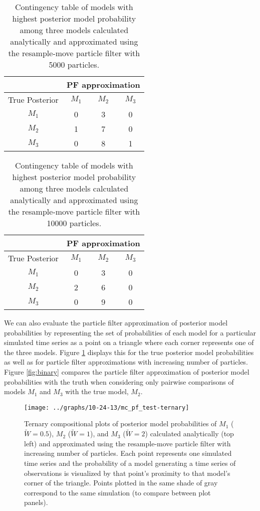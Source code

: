 \documentclass{article}
\begin{document}
\begin{table}[h]
\centering
\caption{Contingency table of models with highest posterior model probability among three models calculated analytically and approximated using the resample-move particle filter with 5000 particles.}
\label{tab:cont-5000}
\begin{tabular}{|c|c|c|c|}
  \hline
 & \multicolumn{3}{|c|}{PF approximation} \\
 \hline
 True Posterior & $M_1$& $M_2$ & $M_3$ \\
  \hline
$M_1$ &   0 &   3 &   0 \\
\hline
  $M_2$ &   1 &   7 &   0 \\
  \hline
  $M_3$ &   0 &   8 &   1 \\
   \hline
\end{tabular}
\end{table}

\begin{table}[h]
\centering
\caption{Contingency table of models with highest posterior model probability among three models calculated analytically and approximated using the resample-move particle filter with 10000 particles.}
\label{tab:cont-10000}
\begin{tabular}{|c|c|c|c|}
  \hline
 & \multicolumn{3}{|c|}{PF approximation} \\
 \hline
 True Posterior & $M_1$& $M_2$ & $M_3$ \\
  \hline
$M_1$ &   0 &   3 &   0 \\
  \hline
  $M_2$ &   2 &   6 &   0 \\
  \hline
  $M_3$ &   0 &   9 &   0 \\
   \hline
\end{tabular}
\end{table}

We can also evaluate the particle filter approximation of posterior model probabilities by representing the set of probabilities of each model for a particular simulated time series as a point on a triangle where each corner represents one of the three models. Figure \ref{fig:ternary} displays this for the true posterior model probabilities as well as for particle filter approximations with increasing number of particles. Figure \ref{fig:binary} compares the particle filter approximation of posterior model probabilities with the truth when considering only pairwise comparisons of models $M_1$ and $M_3$ with the true model, $M_2$.

\begin{figure}
\texttt{[image: ../graphs/10-24-13/mc\_pf\_test-ternary]}
\caption{Ternary compositional plots of posterior model probabilities of $M_1$ ($\tilde{W} = 0.5$), $M_2$ ($\tilde{W} = 1$), and $M_3$ ($\tilde{W} = 2$) calculated analytically (top left) and approximated using the resample-move particle filter with increasing number of particles. Each point represents one simulated time series and the probability of a model generating a time series of observations is visualized by that point's proximity to that model's corner of the triangle. Points plotted in the same shade of gray correspond to the same simulation (to compare between plot panels).} \label{fig:ternary}
\end{figure}
\end{document}
